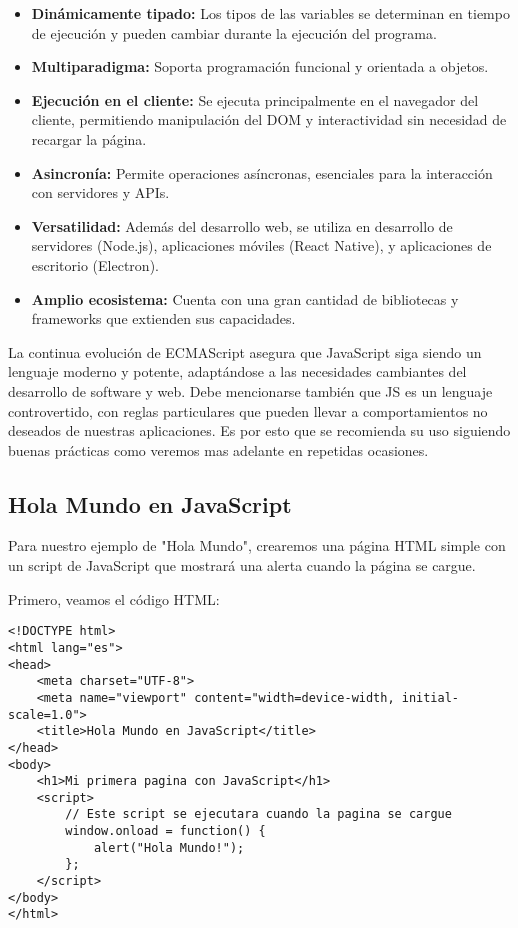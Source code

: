 \documentclass{book}
\begin{document}
\begin{itemize}
    \item \textbf{Dinámicamente tipado:} Los tipos de las variables se determinan en tiempo de ejecución y pueden cambiar durante la ejecución del programa.
    \item \textbf{Multiparadigma:} Soporta programación funcional y orientada a objetos.
    \item \textbf{Ejecución en el cliente:} Se ejecuta principalmente en el navegador del cliente, permitiendo manipulación del DOM y interactividad sin necesidad de recargar la página.
    \item \textbf{Asincronía:} Permite operaciones asíncronas, esenciales para la interacción con servidores y APIs.
    \item \textbf{Versatilidad:} Además del desarrollo web, se utiliza en desarrollo de servidores (Node.js), aplicaciones móviles (React Native), y aplicaciones de escritorio (Electron).
    \item \textbf{Amplio ecosistema:} Cuenta con una gran cantidad de bibliotecas y frameworks que extienden sus capacidades.
\end{itemize}

La continua evolución de ECMAScript asegura que JavaScript siga siendo un lenguaje moderno y potente, adaptándose a las necesidades cambiantes del desarrollo de software y web.
Debe mencionarse también que JS es un lenguaje controvertido, con reglas particulares que pueden llevar a comportamientos no deseados de nuestras aplicaciones. Es por esto que se recomienda su uso siguiendo buenas prácticas como veremos mas adelante en repetidas ocasiones.

\subsection{Hola Mundo en JavaScript}
Para nuestro ejemplo de "Hola Mundo", crearemos una página HTML simple con un script de JavaScript que mostrará una alerta cuando la página se cargue.

Primero, veamos el código HTML:

\begin{lstlisting}[language=HTML5, caption=Hola mundo]
<!DOCTYPE html>
<html lang="es">
<head>
    <meta charset="UTF-8">
    <meta name="viewport" content="width=device-width, initial-scale=1.0">
    <title>Hola Mundo en JavaScript</title>
</head>
<body>
    <h1>Mi primera pagina con JavaScript</h1>
    <script>
        // Este script se ejecutara cuando la pagina se cargue
        window.onload = function() {
            alert("Hola Mundo!");
        };
    </script>
</body>
</html>
\end{lstlisting}
\end{document}
